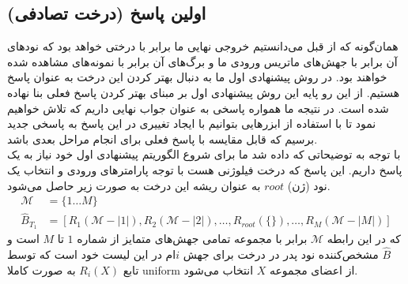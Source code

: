 \subsection{اولین پاسخ (درخت تصادفی)}
همان‌گونه که از قبل می‌دانستیم خروجی نهایی ما برابر با درختی خواهد بود که نودهای آن برابر با جهش‌های ماتریس ورودی ما و برگ‌های آن برابر با نمونه‌های مشاهده شده خواهند بود. در روش پیشنهادی اول ما به دنبال بهتر کردن این درخت به عنوان پاسخ هستیم. از این رو پایه این روش پیشنهادی اول بر مبنای بهتر کردن پاسخ فعلی بنا نهاده شده است. در نتیجه ما همواره پاسخی به عنوان جواب نهایی داریم که تلاش خواهیم نمود تا با استفاده از ابزرهایی بتوانیم با ایجاد تغییری در این پاسخ به پاسخی جدید برسیم که قابل مقایسه با پاسخ فعلی برای انجام مراحل بعدی باشد.
\\
 با توجه به توضیحاتی که داده شد ما برای شروع الگوریتم پیشنهادی اول خود نیاز به یک پاسخ داریم. این پاسخ که درخت فیلوژنی هست با توجه پارامترهای ورودی و انتخاب یک نود (ژن) $root$ به عنوان ریشه این درخت به صورت زیر حاصل می‌شود.
 \begin{equation}
 	\begin{aligned}
 		\mathcal{M} &= \{1\dots M\} \\
 		\hat{B}_{T_1} &= [R_1(\mathcal{M}-|1|), R_2(\mathcal{M}-|2|), \dots, R_{root}(\{\}), \dots, R_M(\mathcal{M}-|M|)] 
 	\end{aligned}
 \end{equation}
که در این رابطه $\mathcal{M}$ برابر با مجموعه تمامی جهش‌های متمایز از شماره $1$ تا  $M$ است و $\hat{B}$ مشخص‌کننده نود پدر در درخت برای جهش $i$ام در این لیست خود است که توسط تابع $R_i(X)$ به صورت کاملا \gls{uniform} از اعضای مجموعه  $X$ انتخاب می‌شود.
\\

